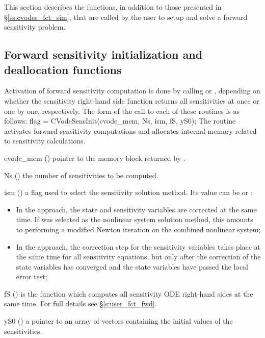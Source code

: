This section describes the {\cvodes} functions, in addition to those presented
in \S\ref{ss:cvodes_fct_sim}, that are called by the user to setup and solve
a forward sensitivity problem.

\subsection{Forward sensitivity initialization and deallocation functions}
\label{ss:sensi_malloc}
Activation of forward sensitivity computation is done by calling
 or , depending on whether the sensitivity
right-hand side function returns all sensitivities at once or one by one, respectively.
The form of the call to each of these routines is as follows:
{
  flag = CVodeSensInit(cvode\_mem, Ns, ism, fS, yS0);
}
{
  The routine  activates forward sensitivity computations and
  allocates internal memory related to sensitivity calculations.
}
{
  \begin{args}

  \item[cvode\_mem] ()
    pointer to the {\cvodes} memory block returned by .

  \item[Ns] () 
    the number of sensitivities to be computed.

  \item[ism] ()
    a flag used to select the sensitivity solution method.  Its value can be
     or :
    \begin{itemize}
    \item In the  approach, the state and sensitivity variables are
      corrected at the same time. If  was selected as the nonlinear system 
      solution method, this amounts to performing a modified Newton iteration on the
      combined nonlinear system;
    \item In the  approach, the correction step for the sensitivity
      variables takes place at the same time for all sensitivity equations, but only after 
      the correction of the state variables has converged and the state variables 
      have passed the local error test; 
    \end{itemize}

  \item[fS] ()
    is the {\C} function which computes all sensitivity ODE right-hand sides at the same time.
    For full details see \S\ref{s:user_fct_fwd}.

  \item[yS0] () 
    a pointer to an array of  vectors containing the initial 
    values of the sensitivities.

  \end{args}
}
